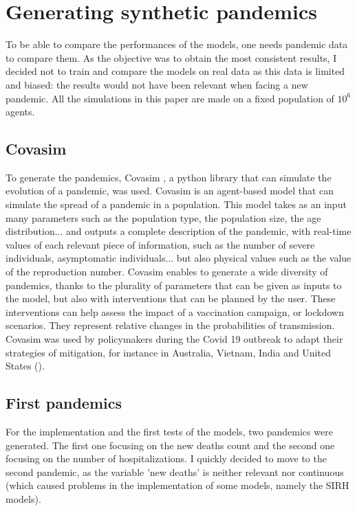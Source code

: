 \section{Generating synthetic pandemics}



To be able to compare the performances of the models, one needs pandemic data to compare them. 
As the objective was to obtain the most consistent results, I decided not to train and compare the models on real data as this data is limited and biased: the results would not have been relevant when facing a new pandemic. 
All the simulations in this paper are made on a fixed population of $10^6$ agents. 

\subsection{Covasim}

To generate the pandemics,  Covasim \cite{kerr2021covasim}, a python library that can simulate the evolution of a pandemic, was used. 
Covasim is an agent-based model that can simulate the spread of a pandemic in a population. 
This model takes as an input many parameters such as the population type, the population size, the age distribution... and outputs a complete description of the pandemic, with real-time values of each relevant piece of information, such as the number of severe individuals, asymptomatic individuals... but also physical values such as the value of the reproduction number. 
Covasim enables to generate a wide diversity of pandemics, thanks to the plurality of parameters that can be given as inputs to the model, but also with interventions that can be planned by the user. 
These interventions can help assess the impact of a vaccination campaign, or lockdown scenarios. 
They represent relative changes in the probabilities of transmission. 
Covasim was used by policymakers during the Covid 19 outbreak to adapt their strategies of mitigation, for instance in Australia, Vietnam, India and United States (\cite{kerr2021covasim}). 

\subsection{First pandemics}
\label{sec:first_pandemics}
For the implementation and the first tests of the models, two pandemics were generated. 
The first one focusing on the new deaths count and the second one focusing on the number of hospitalizations. 
I quickly decided to move to the second pandemic, as the variable 'new deaths' is neither relevant nor continuous (which caused problems in the implementation of some models, namely the SIRH models).


